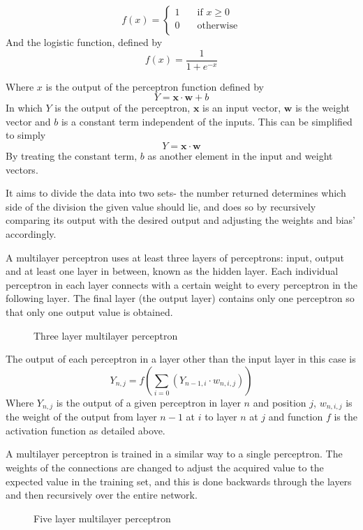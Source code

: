 \documentclass[a4paper,12pt,twoside]{report}
\begin{document}
$$f(x)=\left\{ 
  \begin{array}{ll}
    1 & \quad \text{if } x \geq 0 \\
    0 & \quad \text{otherwise}\\
  \end{array}\right.$$
And the logistic function, defined by 
$$f(x) = \frac{1}{1 + e^{-x}}$$

Where $x$ is the output of the perceptron function defined by
$$Y = \mathbf{x} \cdot \mathbf{w} + b$$
In which $Y$ is the output of the perceptron, $\mathbf{x}$ is an input vector, $\mathbf{w}$ is the weight vector and $b$ is a constant term independent of the inputs.
This can be simplified to simply 
$$Y = \mathbf{x} \cdot \mathbf{w}$$
By treating the constant term, $b$ as another element in the input and weight vectors.

It aims to divide the data into two sets- the number returned determines which side of the division the given value should lie, and does so by recursively comparing its output with the desired output and adjusting the weights and bias' accordingly.

A multilayer perceptron uses at least three layers of perceptrons: input, output and at least one layer in between, known as the hidden layer. Each individual perceptron in each layer connects with a certain weight to every perceptron in the following layer. The final layer (the output layer) contains only one perceptron so that only one output value is obtained.

\begin{figure}[H]
  \centering
  
  \caption{Three layer multilayer perceptron}
\end{figure}

The output of each perceptron in a layer other than the input layer in this case is 
$$Y_{n,j} = f(\sum_{i=0} (Y_{n-1,i} \cdot w_{n,i,j}))$$
Where $Y_{n,j}$ is the output of a given perceptron in layer $n$ and position $j$, $w_{n,i,j}$ is the weight of the output from layer $n-1$ at $i$ to layer $n$ at $j$ and function $f$ is the activation function as detailed above.

A multilayer perceptron is trained in a similar way to a single perceptron. The weights of the connections are changed to adjust the acquired value to the expected value in the training set, and this is done backwards through the layers and then recursively over the entire network.

\begin{figure}[H]
  \centering
  
  \caption{Five layer multilayer perceptron}
  \label{fivemlp}
\end{figure}
\end{document}
